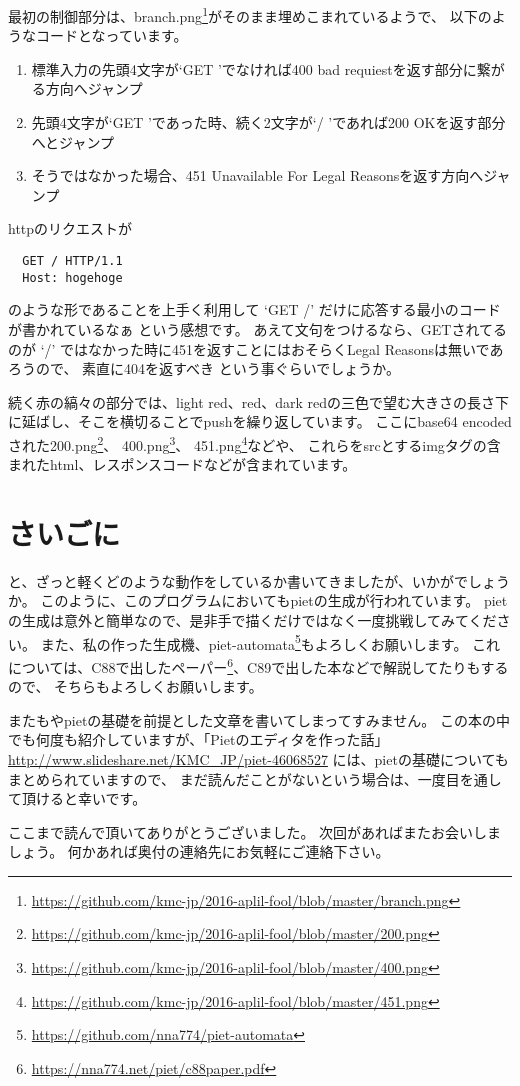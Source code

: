 最初の制御部分は、branch.png\footnote{\url{https://github.com/kmc-jp/2016-aplil-fool/blob/master/branch.png}}がそのまま埋めこまれているようで、
以下のようなコードとなっています。

\begin{enumerate}
  \item 標準入力の先頭4文字が`GET 'でなければ400 bad requiestを返す部分に繋がる方向へジャンプ
  \item 先頭4文字が`GET 'であった時、続く2文字が`/ 'であれば200 OKを返す部分へとジャンプ
  \item そうではなかった場合、451 Unavailable For Legal Reasonsを返す方向へジャンプ
\end{enumerate}

httpのリクエストが
\begin{lstlisting}
  GET / HTTP/1.1
  Host: hogehoge
\end{lstlisting}
のような形であることを上手く利用して `GET /' だけに応答する最小のコードが書かれているなぁ という感想です。
あえて文句をつけるなら、GETされてるのが `/' ではなかった時に451を返すことにはおそらくLegal Reasonsは無いであろうので、
素直に404を返すべき という事ぐらいでしょうか。

続く赤の縞々の部分では、light red、red、dark redの三色で望む大きさの長さ下に延ばし、そこを横切ることでpushを繰り返しています。
ここにbase64 encodedされた200.png\footnote{\url{https://github.com/kmc-jp/2016-aplil-fool/blob/master/200.png}}、
400.png\footnote{\url{https://github.com/kmc-jp/2016-aplil-fool/blob/master/400.png}}、
451.png\footnote{\url{https://github.com/kmc-jp/2016-aplil-fool/blob/master/451.png}}などや、
これらをsrcとするimgタグの含まれたhtml、レスポンスコードなどが含まれています。

\section{さいごに}

と、ざっと軽くどのような動作をしているか書いてきましたが、いかがでしょうか。
このように、このプログラムにおいてもpietの生成が行われています。
pietの生成は意外と簡単なので、是非手で描くだけではなく一度挑戦してみてください。
また、私の作った生成機、piet-automata\footnote{\url{https://github.com/nna774/piet-automata}}もよろしくお願いします。
これについては、C88で出したペーパー\footnote{\url{https://nna774.net/piet/c88paper.pdf}}、C89で出した本などで解説してたりもするので、
そちらもよろしくお願いします。

またもやpietの基礎を前提とした文章を書いてしまってすみません。
この本の中でも何度も紹介していますが、「Pietのエディタを作った話」
\url{http://www.slideshare.net/KMC_JP/piet-46068527}
には、pietの基礎についてもまとめられていますので、
まだ読んだことがないという場合は、一度目を通して頂けると幸いです。

ここまで読んで頂いてありがとうございました。
次回があればまたお会いしましょう。
何かあれば奥付の連絡先にお気軽にご連絡下さい。
